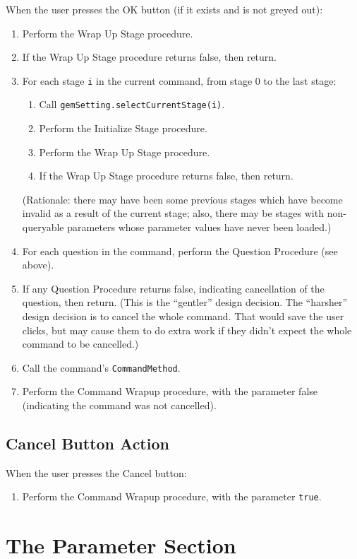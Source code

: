 \documentclass[11pt]{article}
\begin{document}
When the user presses the OK button (if it exists and is not greyed
out):
\begin{enumerate}
\item Perform the Wrap Up Stage procedure.
\item If the Wrap Up Stage procedure returns false, then return.
\item For each stage \verb/i/ in the current command, from stage 0 to the
  last stage:
  \begin{enumerate}
  \item Call {\tt gemSetting.selectCurrentStage(i)}.
  \item Perform the Initialize Stage procedure.
  \item Perform the Wrap Up Stage procedure.
  \item If the Wrap Up Stage procedure returns false, then return.
  \end{enumerate}
  (Rationale:  there may have been some previous stages which have
  become invalid as a result of the current stage; also, there may be
  stages with non-queryable parameters whose parameter values have never
  been loaded.)
\item For each question in the command, perform the Question Procedure
  (see above).
\item If any Question Procedure returns false, indicating cancellation
  of the question, then return.  (This is the ``gentler'' design decision.
  The ``harsher'' design decision is to cancel the whole command.  That
  would save the user clicks, but may cause them to do extra work if
  they didn't expect the whole command to be cancelled.)
\item Call the command's {\tt CommandMethod}.
\item Perform the Command Wrapup procedure, with the parameter false
  (indicating the command was not cancelled).
\end{enumerate}

\subsection{Cancel Button Action}

When the user presses the Cancel button:
\begin{enumerate}
\item Perform the Command Wrapup procedure, with the parameter {\tt true}.
\end{enumerate}

\section{The Parameter Section}
\end{document}
